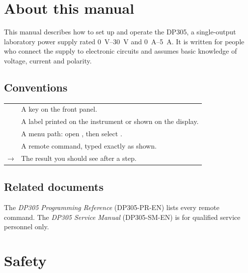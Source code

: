 \documentclass[type=manual, lang=en-GB, otherlangs={zh-HK}]{plaindoc}
\begin{document}
\maketitle
\tableofcontents

\chapter{About this manual}

This manual describes how to set up and operate the DP305, a single-output
laboratory power supply rated \qtyrange{0}{30}{\volt} and \qtyrange{0}{5}{\ampere}.
It is written for people who connect the supply to electronic circuits and
assumes basic knowledge of voltage, current and polarity.

\section{Conventions}

\begin{tabularx}{\linewidth}{@{}P{30mm}L@{}}
\toprule
{} &  \\
\midrule
{}   & A key on the front panel. \\
   & A label printed on the instrument or shown on the display. \\
 & A menu path: open , then select . \\
 & A remote command, typed exactly as shown. \\
→ & The result you should see after a step. \\
\bottomrule
\end{tabularx}

\section{Related documents}

The \emph{DP305 Programming Reference} (DP305-PR-EN) lists every remote
command. The \emph{DP305 Service Manual} (DP305-SM-EN) is for qualified
service personnel only.

\chapter{Safety}
\end{document}
